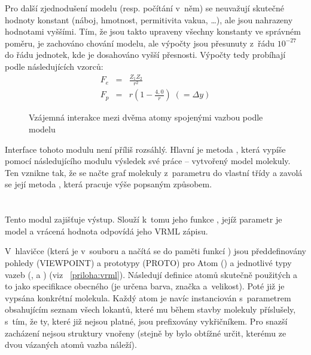 Pro další zjednodušení modelu (resp. počítání v~něm) se neuvažují sku\-teč\-né
hodnoty konstant (náboj, hmotnost, permitivita vakua, \dots), ale jsou nahrazeny
hodnotami vyššími. Tím, že jsou takto upraveny všechny konstanty ve správném
poměru, je zachováno chování modelu, ale výpočty jsou přesunuty z~řádu
$10^{-27}$ do řádu jednotek, kde je dosahováno vyšší přesnosti. Výpočty tedy
probíhají podle následujících vzorců:
\begin{eqnarray*}
	F_e&=&\frac{Z_1 Z_2}{r^2} \\
	F_p&=&r\left(1-\frac{4,0}{r}\right)\;\left(=\Delta y\right)
\end{eqnarray*}

\begin{figure}[h]
	\caption{Vzájemná interakce mezi dvěma atomy spojenými vazbou podle modelu}
\end{figure}

Interface tohoto modulu není příliš rozsáhlý. Hlavní je metoda
, která vypíše pomocí následujícího modulu 
výsledek své práce -- vytvořený model molekuly. Ten vznikne tak, že se načte
graf molekuly z~parametru do vlastní třídy  a zavolá se její
metoda , která pracuje výše popsaným způsobem.

\section{}
Tento modul zajišťuje výstup. Slouží k~tomu jeho funkce ,
jejíž parametr je model a vrácená hodnota odpovídá jeho VRML zápisu.

V~hlavičce (která je v~souboru  a načítá se do paměti funkcí
) jsou předdefinovány pohledy (VIEWPOINT) a prototypy
(PROTO) pro Atom () a jednotlivé typy vazeb (,
 a ) (viz {\appendixname}~\ref{priloha:vrml}). Následují
definice atomů skutečně použitých a to jako specifikace obecného  (je
určena barva, značka a~velikost). Poté již je vypsána konkrétní molekula. Každý
atom je navíc instanciován s~parametrem obsahujícím seznam všech lokantů, které
mu během stavby molekuly příslušely, s~tím, že ty, které již nejsou platné, jsou
prefixovány vykřičníkem. Pro snazší zacházení nejsou struktury vnořeny (stejně
by bylo obtížné určit, kterému ze dvou vázaných atomů vazba náleží).

